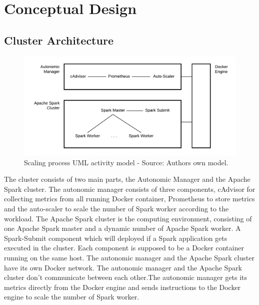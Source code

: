 \chapter{Conceptual Design}
\label{sec:design}
%


\section{Cluster Architecture}

\begin{figure}[h]%
\centering
\includegraphics[scale=0.8]{images/04_conceptual_design/cluster_architecture/overall_architecture}%
\caption{Scaling process UML activity model - Source: Authors own model.}%
\label{fig:ca-overall_architecture}%
\end{figure}


The cluster consists of two main parts, the Autonomic Manager and the Apache Spark cluster. The autonomic manager consists of three components, cAdvisor for collecting metrics from all running Docker container, Prometheus to store metrics and the auto-scaler to scale the number of Spark worker according to the workload.
The Apache Spark cluster is the computing environment, consisting of one Apache Spark master and a dynamic number of Apache Spark worker. A Spark-Submit component which will deployed if a Spark application gets executed in the cluster.
Each component is supposed to be a Docker container running on the same host. The autonomic manager and the Apache Spark cluster have its own Docker network.
The autonomic manager and the Apache Spark cluster don't communicate between each other.The autonomic manager gets its metrics directly from the Docker engine and sends instructions to the Docker engine to scale the number of Spark worker.


